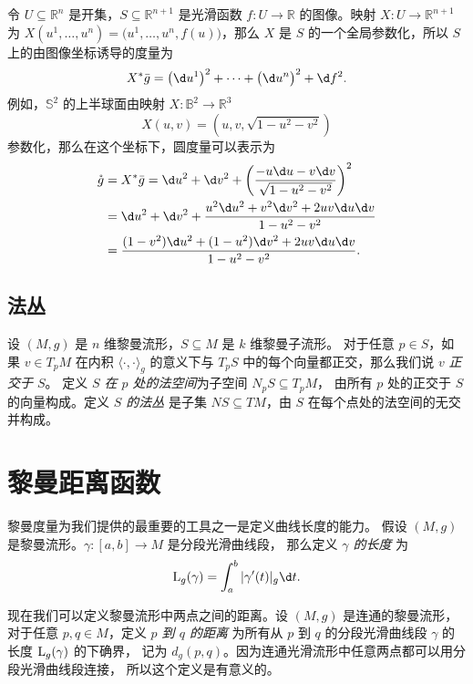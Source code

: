 \begin{example}[图像坐标中的度量]
  令 $U\subseteq \mathbb{R}^n$ 是开集，$S\subseteq \mathbb{R}^{n+1}$
  是光滑函数 $f:U\to \mathbb{R}$ 的图像。映射 $X:U\to \mathbb{R}^{n+1}$
  为 $X(u^1,\dots,u^n)=\bigl(u^1,\dots,u^n,f(u)\bigr)$，那么 $X$
  是 $S$ 的一个全局参数化，所以 $S$ 上的由图像坐标诱导的度量为
  \[
    X^*\bar g=\bigl(\d u^1\bigr)^2+\cdots+\bigl(\d u^n\bigr)^2+\d f^2.
  \]
  例如，$\mathbb{S}^2$ 的上半球面由映射 $X:\mathbb{B}^2\to \mathbb{R}^3$
  \[
    X(u,v)=\left(u,v,\sqrt{1-u^2-v^2}\right)  
  \]
  参数化，那么在这个坐标下，圆度量可以表示为
  \begin{align*}
    \mathring{g}&=X^*\bar g=\d u^2+\d v^2+\left(\frac{-u\d u-v\d v}{\sqrt{1-u^2-v^2}}\right)^2\\
    &=\d u^2+\d v^2+\frac{u^2\d u^2+v^2\d v^2+2uv\d u\d v}{1-u^2-v^2}\\
    &=\frac{(1-v^2)\d u^2+(1-u^2)\d v^2+2uv\d u\d v}{1-u^2-v^2}.
  \end{align*}
\end{example}

\subsection{法丛}

设 $(M,g)$ 是 $n$ 维黎曼流形，$S\subseteq M$ 是 $k$ 维黎曼子流形。
对于任意 $p\in S$，如果 $v\in T_pM$ 在内积 $\langle\cdot,\cdot\rangle_g$
的意义下与 $T_pS$ 中的每个向量都正交，那么我们说 $v$ \emph{正交于 $S$}。
定义 \emph{$S$ 在 $p$ 处的法空间}为子空间 $N_pS\subseteq T_pM$，
由所有 $p$ 处的正交于 $S$ 的向量构成。定义 \emph{$S$ 的法丛}
是子集 $NS\subseteq TM$，由 $S$ 在每个点处的法空间的无交并构成。

\section{黎曼距离函数}

黎曼度量为我们提供的最重要的工具之一是定义曲线长度的能力。
假设 $(M,g)$ 是黎曼流形。$\gamma:[a,b]\to M$ 是分段光滑曲线段，
那么定义 \emph{$\gamma$ 的长度} 为
\[
  \LL_g(\gamma)=\int_a^b|\gamma'(t)|_g \d t.  
\]

现在我们可以定义黎曼流形中两点之间的距离。设 $(M,g)$ 是连通的黎曼流形，
对于任意 $p,q\in M$，定义 \emph{$p$ 到 $q$ 的距离} 为所有从 $p$
到 $q$ 的分段光滑曲线段 $\gamma$ 的长度 ${\mathrm{L}}_g(\gamma)$ 的下确界，
记为 $d_g(p,q)$。因为连通光滑流形中任意两点都可以用分段光滑曲线段连接，
所以这个定义是有意义的。


